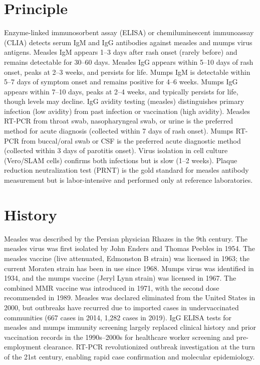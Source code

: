 \section*{Principle}
Enzyme-linked immunosorbent assay (ELISA) or chemiluminescent immunoassay (CLIA) detects serum IgM and IgG antibodies against measles and mumps virus antigens. Measles IgM appears 1--3 days after rash onset (rarely before) and remains detectable for 30--60 days. Measles IgG appears within 5--10 days of rash onset, peaks at 2--3 weeks, and persists for life. Mumps IgM is detectable within 5--7 days of symptom onset and remains positive for 4--6 weeks. Mumps IgG appears within 7--10 days, peaks at 2--4 weeks, and typically persists for life, though levels may decline. IgG avidity testing (measles) distinguishes primary infection (low avidity) from past infection or vaccination (high avidity). Measles RT-PCR from throat swab, nasopharyngeal swab, or urine is the preferred method for acute diagnosis (collected within 7 days of rash onset). Mumps RT-PCR from buccal/oral swab or CSF is the preferred acute diagnostic method (collected within 3 days of parotitis onset). Virus isolation in cell culture (Vero/SLAM cells) confirms both infections but is slow (1--2 weeks). Plaque reduction neutralization test (PRNT) is the gold standard for measles antibody measurement but is labor-intensive and performed only at reference laboratories.

\section*{History}
Measles was described by the Persian physician Rhazes in the 9th century. The measles virus was first isolated by John Enders and Thomas Peebles in 1954. The measles vaccine (live attenuated, Edmonston B strain) was licensed in 1963; the current Moraten strain has been in use since 1968. Mumps virus was identified in 1934, and the mumps vaccine (Jeryl Lynn strain) was licensed in 1967. The combined MMR vaccine was introduced in 1971, with the second dose recommended in 1989. Measles was declared eliminated from the United States in 2000, but outbreaks have recurred due to imported cases in undervaccinated communities (667 cases in 2014, 1,282 cases in 2019). IgG ELISA tests for measles and mumps immunity screening largely replaced clinical history and prior vaccination records in the 1990s--2000s for healthcare worker screening and pre-employment clearance. RT-PCR revolutionized outbreak investigation at the turn of the 21st century, enabling rapid case confirmation and molecular epidemiology.

